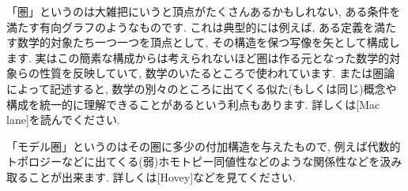 \documentclass[. /main]{subfiles}
\begin{document}
\theoremstyle{definition}
\newtheorem{momotheo}{Theorem}
\newtheorem{momodefi}[momotheo]{Definition}
\newtheorem{momoprop}[momotheo]{Proposition}
\newtheorem{lemm}[momotheo]{Lemma}



「圏」というのは大雑把にいうと頂点がたくさんあるかもしれない, ある条件を満たす有向グラフのようなものです. これは典型的には例えば, ある定義を満たす数学的対象たち一つ一つを頂点として, その構造を保つ写像を矢として構成します. 実はこの簡素な構成からは考えられないほど圏は作る元となった数学的対象らの性質を反映していて, 数学のいたるところで使われています. または圏論によって記述すると, 数学の別々のところに出てくる似た(もしくは同じ)概念や構成を統一的に理解できることがあるという利点もあります. 詳しくは[Mac lane]を読んでください. 

「モデル圏」というのはその圏に多少の付加構造を与えたもので, 例えば代数的トポロジーなどに出てくる(弱)ホモトピー同値性などのような関係性などを汲み取ることが出来ます. 詳しくは[Hovey]などを見てください. 
\end{document}
